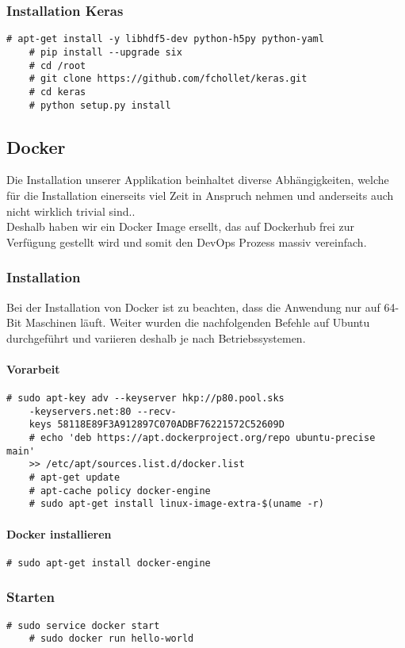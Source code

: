 \subsubsection{Installation Keras}
\begin{lstlisting}[style=BashInputStyle]
	# apt-get install -y libhdf5-dev python-h5py python-yaml
	# pip install --upgrade six
	# cd /root
	# git clone https://github.com/fchollet/keras.git 
	# cd keras
	# python setup.py install
\end{lstlisting}
\newpage

\subsection{Docker}
\label{subsec:docker}
Die Installation unserer Applikation beinhaltet diverse Abhängigkeiten, welche für die Installation einerseits viel Zeit in Anspruch nehmen und anderseits auch nicht wirklich trivial sind.. \\
Deshalb haben wir ein Docker Image ersellt, das auf Dockerhub \cite{DokerCrosswalk} frei zur Verfügung gestellt wird und somit den DevOps Prozess massiv vereinfach.\\

\subsubsection{Installation}
Bei der Installation von Docker ist zu beachten, dass die Anwendung nur auf 64-Bit Maschinen läuft. Weiter wurden die nachfolgenden Befehle auf Ubuntu durchgeführt und variieren deshalb je nach Betriebssystemen. 

\paragraph{Vorarbeit}
\begin{lstlisting}[style=BashInputStyle]
	# sudo apt-key adv --keyserver hkp://p80.pool.sks
	-keyservers.net:80 --recv-		
	keys 58118E89F3A912897C070ADBF76221572C52609D
	# echo 'deb https://apt.dockerproject.org/repo ubuntu-precise main' 
	>> /etc/apt/sources.list.d/docker.list
	# apt-get update
	# apt-cache policy docker-engine
	# sudo apt-get install linux-image-extra-$(uname -r)
\end{lstlisting}
\paragraph{Docker installieren}
\begin{lstlisting}[style=BashInputStyle]
	# sudo apt-get install docker-engine
\end{lstlisting}

\subsubsection{Starten}
\begin{lstlisting}[style=BashInputStyle]
	# sudo service docker start
	# sudo docker run hello-world
\end{lstlisting}

